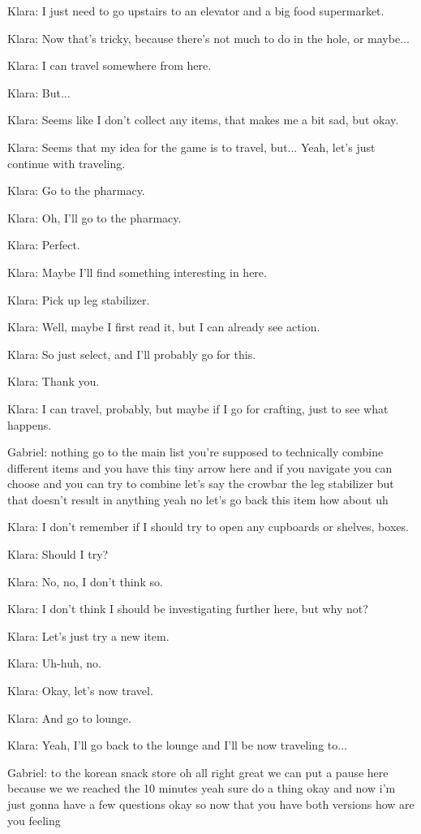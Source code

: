 Klara: I just need to go upstairs to an elevator and a big food supermarket.

Klara: Now that's tricky, because there's not much to do in the hole, or maybe...

Klara: I can travel somewhere from here.

Klara: But...

Klara: Seems like I don't collect any items, that makes me a bit sad, but okay.

Klara: Seems that my idea for the game is to travel, but... Yeah, let's just continue with traveling.

Klara: Go to the pharmacy.

Klara: Oh, I'll go to the pharmacy.

Klara: Perfect.

Klara: Maybe I'll find something interesting in here.

Klara: Pick up leg stabilizer.

Klara: Well, maybe I first read it, but I can already see action.

Klara: So just select, and I'll probably go for this.

Klara: Thank you.

Klara: I can travel, probably, but maybe if I go for crafting, just to see what happens.

Gabriel: nothing go to the main list you're supposed to technically combine different items and you have this tiny arrow here and if you navigate you can choose and you can try to combine let's say the crowbar the leg stabilizer but that doesn't result in anything yeah no let's go back this item how about uh

Klara: I don't remember if I should try to open any cupboards or shelves, boxes.

Klara: Should I try?

Klara: No, no, I don't think so.

Klara: I don't think I should be investigating further here, but why not?

Klara: Let's just try a new item.

Klara: Uh-huh, no.

Klara: Okay, let's now travel.

Klara: And go to lounge.

Klara: Yeah, I'll go back to the lounge and I'll be now traveling to...

Gabriel: to the korean snack store oh all right great we can put a pause here because we we reached the 10 minutes yeah sure do a thing okay and now i'm just gonna have a few questions okay so now that you have both versions how are you feeling

